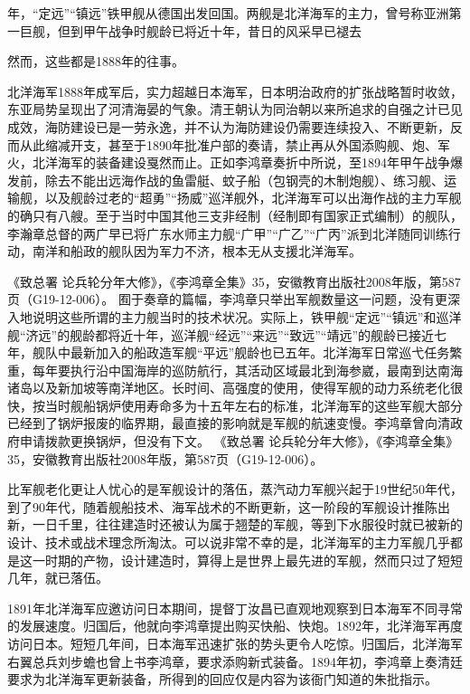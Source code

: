 \documentclass[12pt,UTF8]{ctexbook}
\begin{document}
年，“定远”“镇远”铁甲舰从德国出发回国。两舰是北洋海军的主力，曾号称亚洲第一巨舰，但到甲午战争时舰龄已将近十年，昔日的风采早已褪去

然而，这些都是1888年的往事。

北洋海军1888年成军后，实力超越日本海军，日本明治政府的扩张战略暂时收敛，东亚局势呈现出了河清海晏的气象。清王朝认为同治朝以来所追求的自强之计已见成效，海防建设已是一劳永逸，并不认为海防建设仍需要连续投入、不断更新，反而从此缩减开支，甚至于1890年批准户部的奏请，禁止再从外国添购舰、炮、军火，北洋海军的装备建设戛然而止。正如李鸿章奏折中所说，至1894年甲午战争爆发前，除去不能出远海作战的鱼雷艇、蚊子船（包钢壳的木制炮舰）、练习舰、运输舰，以及舰龄过老的“超勇”“扬威”巡洋舰外，北洋海军可以出海作战的主力军舰的确只有八艘。至于当时中国其他三支非经制（经制即有国家正式编制）的舰队，李瀚章总督的两广早已将广东水师主力舰“广甲”“广乙”“广丙”派到北洋随同训练行动，南洋和船政的舰队因为军力不济，根本无从支援北洋海军。

《致总署 论兵轮分年大修》，《李鸿章全集》35，安徽教育出版社2008年版，第587页（G19-12-006）。
囿于奏章的篇幅，李鸿章只举出军舰数量这一问题，没有更深入地说明这些所谓的主力舰当时的技术状况。实际上，铁甲舰“定远”“镇远”和巡洋舰“济远”的舰龄都将近十年，巡洋舰“经远”“来远”“致远”“靖远”的舰龄已接近七年，舰队中最新加入的船政造军舰“平远”舰龄也已五年。北洋海军日常巡弋任务繁重，每年要执行沿中国海岸的巡防航行，其活动区域最北到海参崴，最南到达南海诸岛以及新加坡等南洋地区。长时间、高强度的使用，使得军舰的动力系统老化很快，按当时舰船锅炉使用寿命多为十五年左右的标准，北洋海军的这些军舰大部分已经到了锅炉报废的临界期，最直接的影响就是军舰的航速变慢。李鸿章曾向清政府申请拨款更换锅炉，但没有下文。 《致总署 论兵轮分年大修》，《李鸿章全集》35，安徽教育出版社2008年版，第587页（G19-12-006）。

比军舰老化更让人忧心的是军舰设计的落伍，蒸汽动力军舰兴起于19世纪50年代，到了90年代，随着舰船技术、海军战术的不断更新，这一阶段的军舰设计推陈出新，一日千里，往往建造时还被认为属于翘楚的军舰，等到下水服役时就已被新的设计、技术或战术理念所淘汰。可以说非常不幸的是，北洋海军的主力军舰几乎都是这一时期的产物，设计建造时，算得上是世界上最先进的军舰，然而只过了短短几年，就已落伍。

1891年北洋海军应邀访问日本期间，提督丁汝昌已直观地观察到日本海军不同寻常的发展速度。归国后，他就向李鸿章提出购买快船、快炮。1892年，北洋海军再度访问日本。短短几年间，日本海军迅速扩张的势头更令人吃惊。归国后，北洋海军右翼总兵刘步蟾也曾上书李鸿章，要求添购新式装备。1894年初，李鸿章上奏清廷要求为北洋海军更新装备，所得到的回应仅是内容为该衙门知道的朱批指示。
\end{document}
